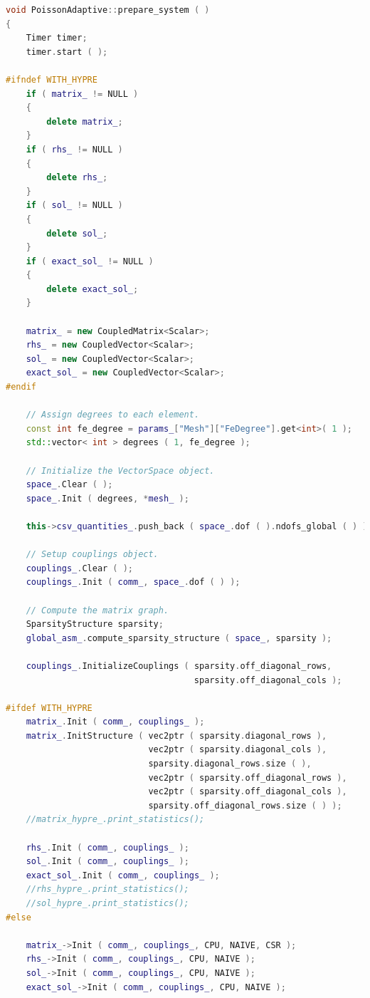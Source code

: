 \documentclass[a4paper, 11pt, twoside]{article}
\begin{document}
\begin{lstlisting}[language=C++, basicstyle={\footnotesize, \ttfamily}, keywordstyle=\color{blue}, numbers=none, tabsize=4]
void PoissonAdaptive::prepare_system ( )
{
    Timer timer;
    timer.start ( );

#ifndef WITH_HYPRE
    if ( matrix_ != NULL )
    {
        delete matrix_;
    }
    if ( rhs_ != NULL )
    {
        delete rhs_;
    }
    if ( sol_ != NULL )
    {
        delete sol_;
    }
    if ( exact_sol_ != NULL )
    {
        delete exact_sol_;
    }

    matrix_ = new CoupledMatrix<Scalar>;
    rhs_ = new CoupledVector<Scalar>;
    sol_ = new CoupledVector<Scalar>;
    exact_sol_ = new CoupledVector<Scalar>;
#endif

    // Assign degrees to each element.
    const int fe_degree = params_["Mesh"]["FeDegree"].get<int>( 1 );
    std::vector< int > degrees ( 1, fe_degree );

    // Initialize the VectorSpace object.
    space_.Clear ( );
    space_.Init ( degrees, *mesh_ );

    this->csv_quantities_.push_back ( space_.dof ( ).ndofs_global ( ) );

    // Setup couplings object.
    couplings_.Clear ( );
    couplings_.Init ( comm_, space_.dof ( ) );

    // Compute the matrix graph.
    SparsityStructure sparsity;
    global_asm_.compute_sparsity_structure ( space_, sparsity );

    couplings_.InitializeCouplings ( sparsity.off_diagonal_rows,
                                     sparsity.off_diagonal_cols );

#ifdef WITH_HYPRE
    matrix_.Init ( comm_, couplings_ );
    matrix_.InitStructure ( vec2ptr ( sparsity.diagonal_rows ),
                            vec2ptr ( sparsity.diagonal_cols ),
                            sparsity.diagonal_rows.size ( ),
                            vec2ptr ( sparsity.off_diagonal_rows ),
                            vec2ptr ( sparsity.off_diagonal_cols ),
                            sparsity.off_diagonal_rows.size ( ) );
    //matrix_hypre_.print_statistics();

    rhs_.Init ( comm_, couplings_ );
    sol_.Init ( comm_, couplings_ );
    exact_sol_.Init ( comm_, couplings_ );
    //rhs_hypre_.print_statistics();
    //sol_hypre_.print_statistics();
#else

    matrix_->Init ( comm_, couplings_, CPU, NAIVE, CSR );
    rhs_->Init ( comm_, couplings_, CPU, NAIVE );
    sol_->Init ( comm_, couplings_, CPU, NAIVE );
    exact_sol_->Init ( comm_, couplings_, CPU, NAIVE );


\end{lstlisting}
\end{document}
